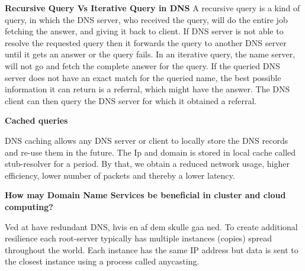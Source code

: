 \textbf{Recursive Query Vs Iterative Query in DNS}
A recursive query is a kind of query, in which the DNS server, who received the query, will do the entire job fetching the answer, and giving it back to client. If DNS server is not able to resolve the requested query then it forwards the query to another DNS server until it gets an answer or the query fails.
In an iterative query, the name server, will not go and fetch the complete answer for the query. If the queried DNS server does not have an exact match for the queried name, the best possible information it can return is a referral, which might have the answer. The DNS client can then query the DNS server for which it obtained a referral.


\textbf{Cached queries}

DNS caching allows any DNS server or client to locally store the DNS records and re-use them in the future. The Ip and domain is stored in local cache called stub-resolver for a period. By that, we obtain a reduced network usage, higher efficiency, lower number of packets and thereby a lower latency. 

\textbf{How may Domain Name Services be beneficial in cluster and cloud computing?}

Ved at have redundant DNS, hvis en af dem skulle gaa ned.
To create additional resilience each root-server typically has multiple instances (copies) spread throughout the world. Each instance has the same IP address but data is sent to the closest instance using a process called anycasting.
